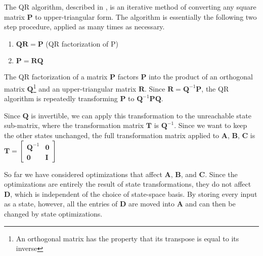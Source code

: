     The QR algorithm, described in \cite{Trefethen}, is an iterative method of
converting any square matrix $\mathbf{P}$ to upper-triangular
form. The algorithm is essentially the following two step
procedure, applied as many times as necessary.
\begin{enumerate}
\vspace{\itemshrink} \item $\mathbf{Q} \mathbf{R} = \mathbf{P}$   (QR factorization of
P)

\vspace{\itemshrink} \item $\mathbf{P} = \mathbf{R} \mathbf{Q}$
\vspace{\itemshrink} \end{enumerate}

    The QR factorization of a matrix $\mathbf{P}$ factors
$\mathbf{P}$ into the product of an orthogonal matrix
$\mathbf{Q}$\footnote{An orthogonal matrix has the property that
its transpose is equal to its inverse} and an upper-triangular
matrix $\mathbf{R}$. Since $\mathbf{R} = \mathbf{Q}^{-1}
\mathbf{P}$, the QR algorithm is repeatedly transforming
$\mathbf{P}$ to $\mathbf{Q}^{-1} \mathbf{P} \mathbf{Q}$.

    Since $\mathbf{Q}$ is invertible, we can apply this
transformation to the unreachable state sub-matrix, where the
transformation matrix $\mathbf{T}$ is $\mathbf{Q}^{-1}$. Since we
want to keep the other states unchanged, the full transformation
matrix applied to $\mathbf{A}$, $\mathbf{B}$, $\mathbf{C}$ is
$\mathbf{T} = \left [ \begin{array} {cc} \mathbf{Q}^{-1} &
\mathbf{0} \\ \mathbf{0} & \mathbf{I} \end{array} \right ]$


    So far we have considered optimizations that affect $\mathbf{A}$,
$\mathbf{B}$, and $\mathbf{C}$. Since the optimizations are
entirely the result of state transformations, they do not affect
$\mathbf{D}$, which is independent of the choice of state-space
basis. By storing every input as a state, however, all the entries
of $\mathbf{D}$ are moved into $\mathbf{A}$ and can then be
changed by state optimizations.

